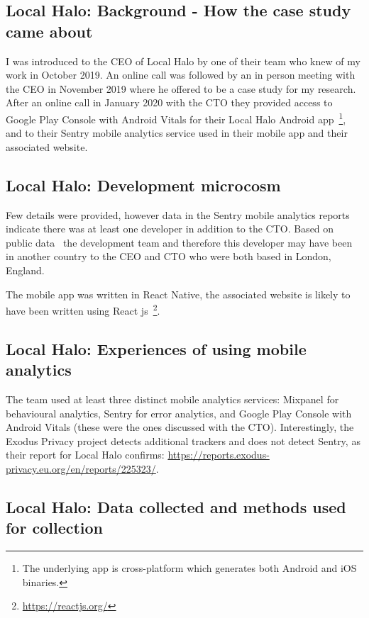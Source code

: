 \subsection{Local Halo: Background - How the case study came about}
I was introduced to the CEO of Local Halo by one of their team who knew of my work in October 2019. An online call was followed by an in person meeting with the CEO in November 2019 where he offered to be a case study for my research. After an online call in January 2020 with the CTO they provided access to Google Play Console with Android Vitals for their Local Halo Android app~\footnote{The underlying app is cross-platform which generates both Android and iOS binaries.}, and to their Sentry mobile analytics service used in their mobile app and their associated website.

\subsection{Local Halo: Development microcosm}
Few details were provided, however data in the Sentry mobile analytics reports indicate there was at least one developer in addition to the CTO. Based on public data~\citep[e.g.]{karpenko2019_localhalo_a_social_network_for_neighbors} the development team and therefore this developer may have been in another country to the CEO and CTO who were both based in London, England.

The mobile app was written in React Native, the associated website is likely to have been written using React js~\footnote{\url{https://reactjs.org/}}. 

\subsection{Local Halo: Experiences of using mobile analytics}
The team used at least three distinct mobile analytics services: Mixpanel for behavioural analytics, Sentry for error analytics, and Google Play Console with Android Vitals (these were the ones discussed with the CTO). Interestingly, the Exodus Privacy project detects additional trackers and does not detect Sentry, as their report for Local Halo confirms: \url{https://reports.exodus-privacy.eu.org/en/reports/225323/}.

\subsection{Local Halo: Data collected and methods used for collection}

